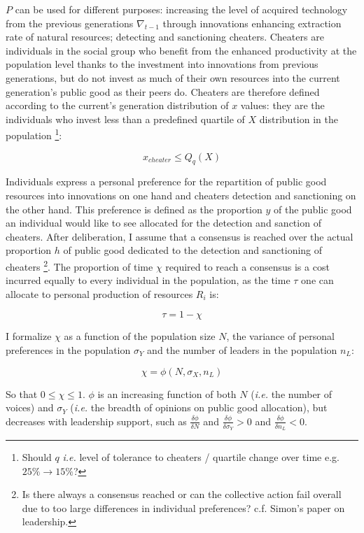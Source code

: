 \documentclass[a4paper]{article}
\begin{document}
$P$ can be used for different purposes: increasing the level of acquired technology from the previous generations $\nabla_{t-1}$ through innovations enhancing extraction rate of natural resources; detecting and sanctioning cheaters. Cheaters are individuals in the social group who benefit from the enhanced productivity at the population level thanks to the investment into innovations from previous generations, but do not invest as much of their own resources into the current generation's public good as their peers do. Cheaters are therefore defined according to the current's generation distribution of $x$ values: they are the individuals who invest less than a predefined quartile of $X$ distribution in the population \footnote{Should $q$ \textit{i.e.} level of tolerance to cheaters / quartile change over time e.g. $25\%\to15\%$?}:

\begin{equation} \label{eq:cheat}
x_{cheater}\leq Q_q(X)
\end{equation}

Individuals express a personal preference for the repartition of public good resources into innovations on one hand and cheaters detection and sanctioning on the other hand. This preference is defined as the proportion $y$ of the public good an individual would like to see allocated for the detection and sanction of cheaters. After deliberation, I assume that a consensus is reached over the actual proportion $h$ of public good dedicated to the detection and sanctioning of cheaters \footnote{Is there always a consensus reached or can the collective action fail overall due to too large differences in individual preferences? c.f. Simon's paper on leadership.}. The proportion of time $\chi$ required to reach a consensus is a cost incurred equally to every individual in the population, as the time $\tau$ one can allocate to personal production of resources $R_i$ is: 

\begin{equation}
\tau=1-\chi
\end{equation}

I formalize $\chi$ as a function of the population size $N$, the variance of personal preferences in the population $\sigma_Y$ and the number of leaders in the population $n_L$:

\begin{equation}
\chi = \phi(N,\sigma_X,n_L)
\end{equation}  

So that $0\leq\chi\leq1$. $\phi$ is an increasing function of both $N$ (\textit{i.e.} the number of voices) and $\sigma_Y$ (\textit{i.e.} the breadth of opinions on public good allocation), but decreases with leadership support, such as $\frac{\delta \phi}{\delta N}$ and $\frac{\delta \phi}{\delta \sigma_Y} > 0$ and $\frac{\delta \phi}{\delta n_L} < 0$.
\end{document}
